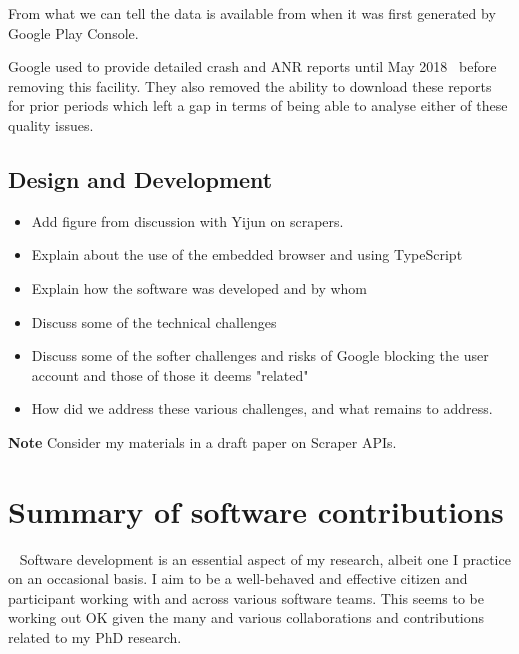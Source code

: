 From what we can tell the data is available from when it was first generated by Google Play Console.

Google used to provide detailed crash and ANR reports until May 2018~\cite{google_play_download_and_export_monthly_reports} before removing this facility. They also removed the ability to download these reports for prior periods which left a gap in terms of being able to analyse either of these quality issues.

\subsection{Design and Development}
\begin{itemize}
    \item Add figure from discussion with Yijun on scrapers.
    \item Explain about the use of the embedded browser and using TypeScript
    \item Explain how the software was developed and by whom
    \item Discuss some of the technical challenges
    \item Discuss some of the softer challenges and risks of Google blocking the user account and those of those it deems "related"
    \item How did we address these various challenges, and what remains to address.
\end{itemize}

\textbf{Note} Consider my materials in a draft paper on Scraper APIs.

\section{Summary of software contributions}~\label{sec:summary-of-software-contributions}
Software development is an essential aspect of my research, albeit one I practice on an occasional basis. I aim to be a well-behaved and effective citizen and participant working with and across various software teams. This seems to be working out OK given the many and various collaborations and contributions related to my PhD research.
